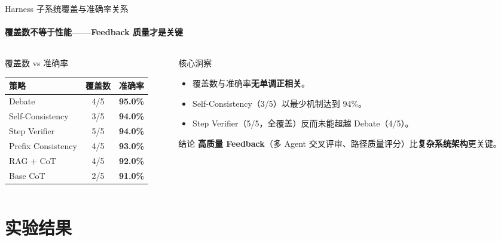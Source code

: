 \documentclass[10pt,aspectratio=169]{beamer}
\newcommand{\tightitems}{\setlength{\itemsep}{0.24em}}
\begin{document}
\begin{frame}{Harness 子系统覆盖与准确率关系}
  \framesubtitle{覆盖数不等于性能——Feedback 质量才是关键}
  \begin{columns}[T,onlytextwidth]
    \begin{column}{0.52\textwidth}
      \begin{block}{覆盖数 vs 准确率}
        \small
        \begin{tabular}{lcc}
          \toprule
          策略 & 覆盖数 & 准确率 \\
          \midrule
          Debate & 4/5 & \textbf{95.0\%} \\
          Self-Consistency & 3/5 & \textbf{94.0\%} \\
          Step Verifier & 5/5 & \textbf{94.0\%} \\
          Prefix Consistency & 4/5 & \textbf{93.0\%} \\
          RAG + CoT & 4/5 & \textbf{92.0\%} \\
          Base CoT & 2/5 & \textbf{91.0\%} \\
          \bottomrule
        \end{tabular}
      \end{block}
    \end{column}
    \begin{column}{0.44\textwidth}
      \begin{alertblock}{核心洞察}
        \begin{itemize}
          \tightitems
          \item 覆盖数与准确率\textbf{无单调正相关}。
          \item Self-Consistency（3/5）以最少机制达到 94\%。
          \item Step Verifier（5/5，全覆盖）反而未能超越 Debate（4/5）。
        \end{itemize}
      \end{alertblock}
      \begin{block}{结论}
        \textbf{高质量 Feedback}（多 Agent 交叉评审、路径质量评分）比\textbf{复杂系统架构}更关键。
      \end{block}
    \end{column}
  \end{columns}
\end{frame}

\section{实验结果}
\end{document}
